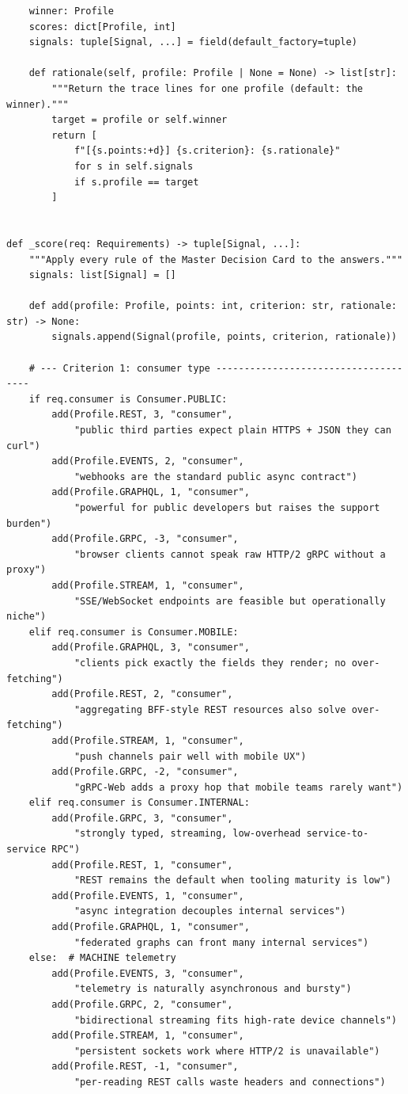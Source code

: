 \begin{verbatim}
    winner: Profile
    scores: dict[Profile, int]
    signals: tuple[Signal, ...] = field(default_factory=tuple)

    def rationale(self, profile: Profile | None = None) -> list[str]:
        """Return the trace lines for one profile (default: the winner)."""
        target = profile or self.winner
        return [
            f"[{s.points:+d}] {s.criterion}: {s.rationale}"
            for s in self.signals
            if s.profile == target
        ]


def _score(req: Requirements) -> tuple[Signal, ...]:
    """Apply every rule of the Master Decision Card to the answers."""
    signals: list[Signal] = []

    def add(profile: Profile, points: int, criterion: str, rationale: str) -> None:
        signals.append(Signal(profile, points, criterion, rationale))

    # --- Criterion 1: consumer type -------------------------------------
    if req.consumer is Consumer.PUBLIC:
        add(Profile.REST, 3, "consumer",
            "public third parties expect plain HTTPS + JSON they can curl")
        add(Profile.EVENTS, 2, "consumer",
            "webhooks are the standard public async contract")
        add(Profile.GRAPHQL, 1, "consumer",
            "powerful for public developers but raises the support burden")
        add(Profile.GRPC, -3, "consumer",
            "browser clients cannot speak raw HTTP/2 gRPC without a proxy")
        add(Profile.STREAM, 1, "consumer",
            "SSE/WebSocket endpoints are feasible but operationally niche")
    elif req.consumer is Consumer.MOBILE:
        add(Profile.GRAPHQL, 3, "consumer",
            "clients pick exactly the fields they render; no over-fetching")
        add(Profile.REST, 2, "consumer",
            "aggregating BFF-style REST resources also solve over-fetching")
        add(Profile.STREAM, 1, "consumer",
            "push channels pair well with mobile UX")
        add(Profile.GRPC, -2, "consumer",
            "gRPC-Web adds a proxy hop that mobile teams rarely want")
    elif req.consumer is Consumer.INTERNAL:
        add(Profile.GRPC, 3, "consumer",
            "strongly typed, streaming, low-overhead service-to-service RPC")
        add(Profile.REST, 1, "consumer",
            "REST remains the default when tooling maturity is low")
        add(Profile.EVENTS, 1, "consumer",
            "async integration decouples internal services")
        add(Profile.GRAPHQL, 1, "consumer",
            "federated graphs can front many internal services")
    else:  # MACHINE telemetry
        add(Profile.EVENTS, 3, "consumer",
            "telemetry is naturally asynchronous and bursty")
        add(Profile.GRPC, 2, "consumer",
            "bidirectional streaming fits high-rate device channels")
        add(Profile.STREAM, 1, "consumer",
            "persistent sockets work where HTTP/2 is unavailable")
        add(Profile.REST, -1, "consumer",
            "per-reading REST calls waste headers and connections")


\end{verbatim}
